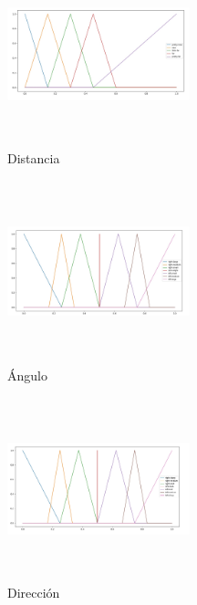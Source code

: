 \documentclass[a4paper,10pt]{article}
\begin{document}
	\begin{figure}[htb]%
		\begin{center}
			\includegraphics[width=200px, height=200px]{images/distance_plot.jpg}
		\end{center}
		\caption{Distancia \label{fig:distance_plot}}%
	\end{figure}
	
	\begin{figure}[htb]%
		\begin{center}
			\includegraphics[width=200px, height=200px]{images/angle_plot.jpg}
		\end{center}
		\caption{Ángulo \label{fig:angle_plot}}%
	\end{figure}
	
	\begin{figure}[htb]%
		\begin{center}
			\includegraphics[width=200px, height=200px]{images/direction_plot.jpg}
		\end{center}
		\caption{Dirección \label{fig:direction_plot}}%
	\end{figure}
\end{document}
